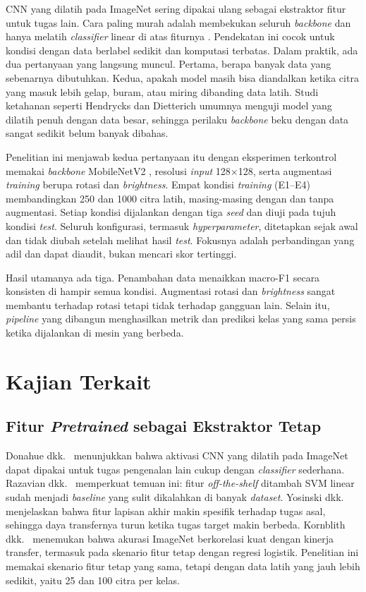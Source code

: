 \documentclass[conference]{IEEEtran}
\begin{document}
CNN yang dilatih pada ImageNet sering dipakai ulang sebagai ekstraktor fitur untuk tugas lain. Cara paling murah adalah membekukan seluruh \emph{backbone} dan hanya melatih \emph{classifier} linear di atas fiturnya \cite{donahue2014decaf}. Pendekatan ini cocok untuk kondisi dengan data berlabel sedikit dan komputasi terbatas. Dalam praktik, ada dua pertanyaan yang langsung muncul. Pertama, berapa banyak data yang sebenarnya dibutuhkan. Kedua, apakah model masih bisa diandalkan ketika citra yang masuk lebih gelap, buram, atau miring dibanding data latih. Studi ketahanan seperti Hendrycks dan Dietterich \cite{hendrycks2019benchmarking} umumnya menguji model yang dilatih penuh dengan data besar, sehingga perilaku \emph{backbone} beku dengan data sangat sedikit belum banyak dibahas.

Penelitian ini menjawab kedua pertanyaan itu dengan eksperimen terkontrol memakai \emph{backbone} MobileNetV2 \cite{sandler2018mobilenetv2}, resolusi \emph{input} 128$\times$128, serta augmentasi \emph{training} berupa rotasi dan \emph{brightness}. Empat kondisi \emph{training} (E1--E4) membandingkan 250 dan 1000 citra latih, masing-masing dengan dan tanpa augmentasi. Setiap kondisi dijalankan dengan tiga \emph{seed} dan diuji pada tujuh kondisi \emph{test}. Seluruh konfigurasi, termasuk \emph{hyperparameter}, ditetapkan sejak awal dan tidak diubah setelah melihat hasil \emph{test}. Fokusnya adalah perbandingan yang adil dan dapat diaudit, bukan mencari skor tertinggi.

Hasil utamanya ada tiga. Penambahan data menaikkan macro-F1 secara konsisten di hampir semua kondisi. Augmentasi rotasi dan \emph{brightness} sangat membantu terhadap rotasi tetapi tidak terhadap gangguan lain. Selain itu, \emph{pipeline} yang dibangun menghasilkan metrik dan prediksi kelas yang sama persis ketika dijalankan di mesin yang berbeda.

\section{Kajian Terkait}\label{sec:related}

\subsection{Fitur \emph{Pretrained} sebagai Ekstraktor Tetap}

Donahue dkk.\ \cite{donahue2014decaf} menunjukkan bahwa aktivasi CNN yang dilatih pada ImageNet \cite{deng2009imagenet} dapat dipakai untuk tugas pengenalan lain cukup dengan \emph{classifier} sederhana. Razavian dkk.\ \cite{razavian2014cnn} memperkuat temuan ini: fitur \emph{off-the-shelf} ditambah SVM linear sudah menjadi \emph{baseline} yang sulit dikalahkan di banyak \emph{dataset}. Yosinski dkk.\ \cite{yosinski2014transferable} menjelaskan bahwa fitur lapisan akhir makin spesifik terhadap tugas asal, sehingga daya transfernya turun ketika tugas target makin berbeda. Kornblith dkk.\ \cite{kornblith2019better} menemukan bahwa akurasi ImageNet berkorelasi kuat dengan kinerja transfer, termasuk pada skenario fitur tetap dengan regresi logistik. Penelitian ini memakai skenario fitur tetap yang sama, tetapi dengan data latih yang jauh lebih sedikit, yaitu 25 dan 100 citra per kelas.
\end{document}
